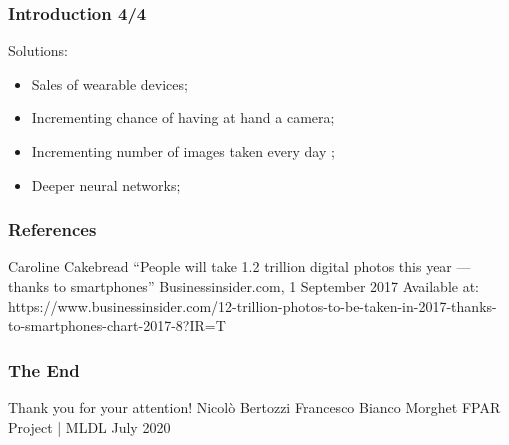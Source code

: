 \documentclass{beamer}
\begin{document}
\begin{frame}
\frametitle{Introduction 4/4}
Solutions:
\begin{itemize}
\item Sales of wearable devices;
\item Incrementing chance of having at hand a camera;
\item Incrementing number of images taken every day \cite{photos};
\item Deeper neural networks;
\end{itemize}
\end{frame}
         
\begin{frame}
\frametitle{References}
   \begin{thebibliography}{9}
		Caroline Cakebread
		\newblock “People will take 1.2 trillion digital photos this year — thanks to smartphones”
		\newblock Businessinsider.com, 1 September 2017
		\newblock Available at: https://www.businessinsider.com/12-trillion-photos-to-be-taken-in-2017-thanks-to-smartphones-chart-2017-8?IR=T
   \end{thebibliography}
\end{frame}

\begin{frame}
\centering
\frametitle{The End}
\Huge Thank you for your attention!
\break
\break
\break
\break
\large Nicolò Bertozzi
\break
Francesco Bianco Morghet
\break
\break
FPAR Project | MLDL
 July 2020
\end{frame}
\end{document}
